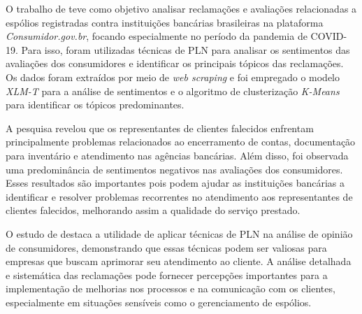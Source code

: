 O trabalho de  teve como objetivo analisar reclamações e avaliações relacionadas a espólios registradas contra instituições bancárias brasileiras na plataforma \textit{Consumidor.gov.br}, focando especialmente no período da pandemia de COVID-19. Para isso, foram utilizadas técnicas de PLN para analisar os sentimentos das avaliações dos consumidores e identificar os principais tópicos das reclamações. Os dados foram extraídos por meio de \textit{web scraping} e foi empregado o modelo \textit{XLM-T} para a análise de sentimentos e o algoritmo de clusterização \textit{K-Means} para identificar os tópicos predominantes.

A pesquisa revelou que os representantes de clientes falecidos enfrentam principalmente problemas relacionados ao encerramento de contas, documentação para inventário e atendimento nas agências bancárias. Além disso, foi observada uma predominância de sentimentos negativos nas avaliações dos consumidores. Esses resultados são importantes pois podem ajudar as instituições bancárias a identificar e resolver problemas recorrentes no atendimento aos representantes de clientes falecidos, melhorando assim a qualidade do serviço prestado.

O estudo de  destaca a utilidade de aplicar técnicas de PLN na análise de opinião de consumidores, demonstrando que essas técnicas podem ser valiosas para empresas que buscam aprimorar seu atendimento ao cliente. A análise detalhada e sistemática das reclamações pode fornecer percepções importantes para a implementação de melhorias nos processos e na comunicação com os clientes, especialmente em situações sensíveis como o gerenciamento de espólios.
